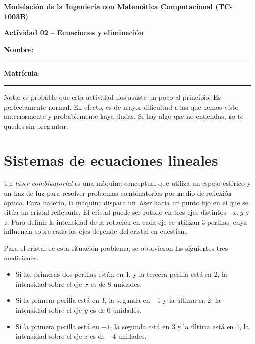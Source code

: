 \documentclass[spanish, 10pt]{article}
\begin{document}
\begin{center}
	{\Large \textbf{Modelación de la Ingeniería con Matemática Computacional (TC-1003B)}}
	
	\bigskip
	{\large \textbf{Actividad 02 -- Ecuaciones y eliminación}}
\end{center}

\bigskip
{\large \textbf{Nombre}: \rule{13.7 cm}{0.4mm}}



\bigskip
{\large \textbf{Matrícula}: \rule{5 cm}{0.4mm}} %

\bigskip

{\footnotesize Nota: es probable que esta actividad nos asuste un poco al principio. Es perfectamente normal.
En efecto, es de mayor dificultad a las que hemos visto anteriormente y probablemente haya dudas.
Si hay algo que no entiendas, no te quedes sin preguntar.}

\section{Sistemas de ecuaciones lineales}

\vspace{3ex}

Un \textit{láser combinatorial} es una máquina conceptual que utiliza un espejo esférico y un haz de luz para resolver problemas combinatorios por medio de reflexión óptica.
Para hacerlo, la máquina dispara un láser hacia un punto fijo en el que se sitúa un cristal reflejante.
El cristal puede ser rotado en tres ejes distintos---$x, y $ y $z$.
Para definir la intensidad de la rotación en cada eje se utilizan 3 perillas, cuya influencia sobre cada los ejes depende del cristal en cuestión.

Para el cristal de esta situación problema, se obtuvieron las siguientes tres mediciones:

\begin{itemize}
    \item Si las primeras dos perillas están en $1$, y la tercera perilla está en $2$, la intensidad sobre el eje $x$ es de $8$ unidades.
    \item Si la primera perilla está en $3$, la segunda en $-1$ y la última en $2$, la intensidad sobre el eje $y$ es de $0$ unidades.
    \item Si la primera perilla está en $-1$, la segunda está en $3$ y la última está en $4$, la intensidad sobre el eje $z$ es de $-4$ unidades.
\end{itemize}
\end{document}
